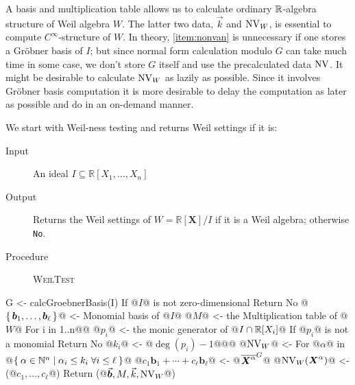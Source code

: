 \documentclass[%
  sigconf,authorversion,screen]{acmart}
\begin{document}
A basis and multiplication table allows us to calculate ordinary $\mathbb{R}$-algebra structure of Weil algebra $W$.
The latter two data, $\vec{k}$ and $\operatorname{NV}_W$, is essential to compute $C^\infty$-structure of $W$.
In theory, \ref{item:nonvan} is unnecessary if one stores a Gr\"{o}bner basis of $I$;
but since normal form calculation modulo $G$ can take much time in some case, we don't store $G$ itself and use the precalculated data $\operatorname{NV}$.
It might be desirable to calculate $\operatorname{NV}_W$ as lazily as possible.
Since it involves Gr\"{o}bner basis computation it is more desirable to delay the computation as later as possible and do in an on-demand manner.

We start with Weil-ness testing and returns Weil settings if it is:

\begin{algorithm}\label{alg:weil-test}
  \hspace{1em}\vspace{-.25em}
  \begin{description}
    \item[Input] An ideal $I \subseteq \mathbb{R}[X_1, \dots, X_n]$
    \item[Output] Returns the Weil settings of $W = \mathbb{R}[\boldsymbol{X}]/I$ if it is a Weil algebra; otherwise \verb|No|.
    \item[Procedure] \textup{\textsc{WeilTest}}
  \end{description}

  \begin{alg}
G <- calcGroebnerBasis(I)
If @$I$@ is not zero-dimensional
  Return No
@$\set{\boldsymbol{b}_1, \dots, \boldsymbol{b}_\ell}$@ <- Monomial basis of @$I$@
@$M$@ <- the Multiplication table of @$W$@
For i in 1..n@\label{line:weil-test:radical-start}@
  @$p_i$@ <- the monic generator of @$I \cap \mathbb{R}[X_i]$@
  If @$p_i$@ is not a monomial
    Return No
  @$k_i$@ <- @$\deg(p_i) - 1$@@\label{line:weil-test:radical-end}@
@$\operatorname{NV}_W$@ <- {}
For @$\alpha$@ in @$\Set{\alpha \in \mathbb{N}^n | \alpha_i \leq k_i \; \forall i \leq \ell}$@
  @$c_1 \boldsymbol{b}_1 + \cdots + c_\ell \boldsymbol{b}_\ell$@ <- @${\overline{\boldsymbol{X}^\alpha}}^{G}$@
  @$\operatorname{NV}_W(\boldsymbol{X}^\alpha)$@ <- (@$c_1, \dots, c_\ell$@)
Return (@$\vec{\boldsymbol{b}}, M, \vec{k}, \operatorname{NV}_W$@)
\end{alg}
\end{algorithm}
\end{document}
